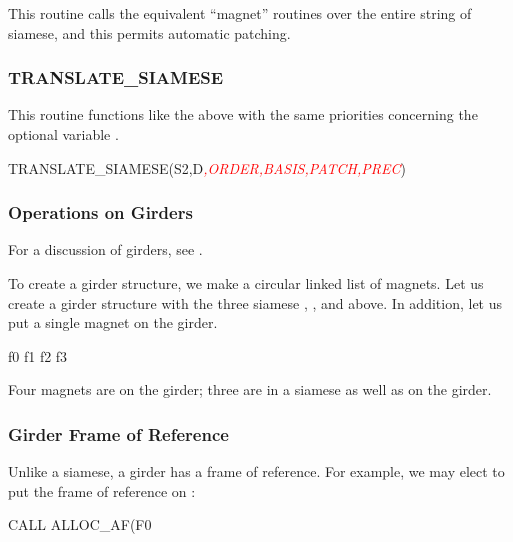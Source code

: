 This routine calls the equivalent ``magnet'' routines over the entire string
of siamese, and this permits automatic patching.


\subsubsection*{TRANSLATE\_SIAMESE}

%
This routine functions like the above  with the same
priorities concerning the optional variable .

\begin{ptccode}
TRANSLATE_SIAMESE(S2,D\textit{\textcolor{red}{,ORDER,BASIS,PATCH,PREC}})
\end{ptccode}


\subsubsection{Operations on Girders}
\label{sec:ops.girders}

For a discussion of girders, see .

%
To create a girder structure, we make a circular linked list of magnets.
Let us create a girder structure with the three siamese , ,
and  above. In addition, let us put a single magnet  on the girder.

\begin{ptccode}
f0%
f1%
f2%
f3%
\end{ptccode}

Four magnets are on the girder; three are in a siamese as well as on the girder.


\subsubsection*{Girder Frame of Reference}

%
Unlike a siamese, a girder has a frame of reference. For example, we
may elect to put the frame of reference on :

\begin{ptccode}
CALL ALLOC_AF(F0%
\end{ptccode}


